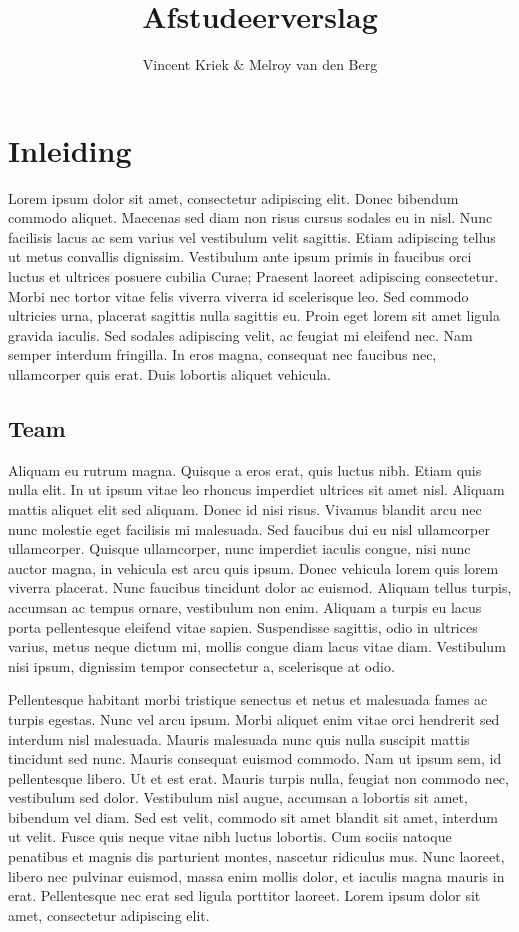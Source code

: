 \documentclass{article}
\begin{document}
\title{Afstudeerverslag}
\author{Vincent Kriek \& Melroy van den Berg}



\section{Inleiding}
Lorem ipsum dolor sit amet, consectetur adipiscing elit. Donec bibendum commodo
aliquet. Maecenas sed diam non risus cursus sodales eu in nisl. Nunc facilisis
lacus ac sem varius vel vestibulum velit sagittis. Etiam adipiscing tellus ut
metus convallis dignissim. Vestibulum ante ipsum primis in faucibus orci luctus
et ultrices posuere cubilia Curae; Praesent laoreet adipiscing consectetur.
Morbi nec tortor vitae felis viverra viverra id scelerisque leo. Sed commodo
ultricies urna, placerat sagittis nulla sagittis eu. Proin eget lorem sit amet
ligula gravida iaculis. Sed sodales adipiscing velit, ac feugiat mi eleifend
nec. Nam semper interdum fringilla. In eros magna, consequat nec faucibus nec,
ullamcorper quis erat. Duis lobortis aliquet vehicula.

\subsection{Team}
Aliquam eu rutrum magna. Quisque a eros erat, quis luctus nibh. Etiam quis nulla
elit. In ut ipsum vitae leo rhoncus imperdiet ultrices sit amet nisl. Aliquam
mattis aliquet elit sed aliquam. Donec id nisi risus. Vivamus blandit arcu nec
nunc molestie eget facilisis mi malesuada. Sed faucibus dui eu nisl ullamcorper
ullamcorper. Quisque ullamcorper, nunc imperdiet iaculis congue, nisi nunc
auctor magna, in vehicula est arcu quis ipsum. Donec vehicula lorem quis lorem
viverra placerat. Nunc faucibus tincidunt dolor ac euismod. Aliquam tellus
turpis, accumsan ac tempus ornare, vestibulum non enim. Aliquam a turpis eu
lacus porta pellentesque eleifend vitae sapien. Suspendisse sagittis, odio in
ultrices varius, metus neque dictum mi, mollis congue diam lacus vitae diam.
Vestibulum nisi ipsum, dignissim tempor consectetur a, scelerisque at odio.

Pellentesque habitant morbi tristique senectus et netus et malesuada fames ac
turpis egestas. Nunc vel arcu ipsum. Morbi aliquet enim vitae orci hendrerit sed
interdum nisl malesuada. Mauris malesuada nunc quis nulla suscipit mattis
tincidunt sed nunc. Mauris consequat euismod commodo. Nam ut ipsum sem, id
pellentesque libero. Ut et est erat. Mauris turpis nulla, feugiat non commodo
nec, vestibulum sed dolor. Vestibulum nisl augue, accumsan a lobortis sit amet,
bibendum vel diam. Sed est velit, commodo sit amet blandit sit amet, interdum ut
velit. Fusce quis neque vitae nibh luctus lobortis. Cum sociis natoque penatibus
et magnis dis parturient montes, nascetur ridiculus mus. Nunc laoreet, libero
nec pulvinar euismod, massa enim mollis dolor, et iaculis magna mauris in erat.
Pellentesque nec erat sed ligula porttitor laoreet. Lorem ipsum dolor sit amet,
consectetur adipiscing elit.
\end{document}
